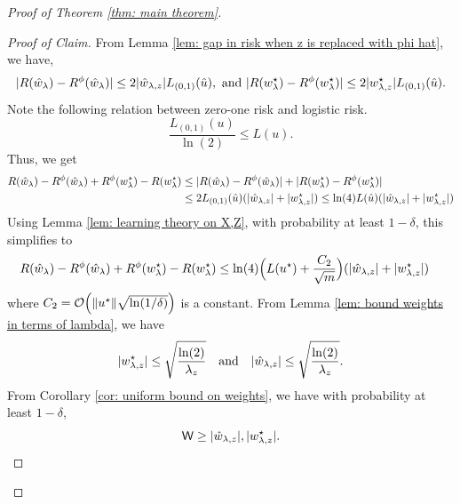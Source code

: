\begin{proof}[Proof of Theorem \ref{thm: main theorem}]
    \begin{proof}[Proof of Claim]
        From Lemma \ref{lem: gap in risk when z is replaced with phi hat}, we have,
        \begin{equation*}
            |R(\hat{w}_\lambda) - R^\phi(\hat{w}_\lambda)|
            \leq 2|\hat{w}_{\lambda,z}|L_{(0,1)}(\hat{u}),\textrm{ and }
            |R(w^\star_{\lambda}) - R^\phi(w^\star_{\lambda})|
            \leq 2|w^\star_{{\lambda,z}}|L_{(0,1)}(\hat{u}).
        \end{equation*}
        Note the following relation between zero-one risk and logistic risk. 
\begin{equation*}
    \frac{L_{(0,1)}(u)}{\ln(2)} \leq L(u).
\end{equation*}
        Thus, we get
        \begin{equation*}
            \begin{aligned}
                  R(\hat{w}_\lambda) - R^\phi(\hat{w}_\lambda) + R^\phi(w^\star_{\lambda}) - R(w^\star_{\lambda})\leq &\;|R(\hat{w}_\lambda) - R^\phi(\hat{w}_\lambda)| + |R(w^\star_{\lambda}) - R^\phi(w^\star_{\lambda})|\\
                  \leq &\;2L_{(0,1)}(\hat{u})(|\hat{w}_{\lambda,z}| + |w^\star_{{\lambda,z}}|) \leq \ln(4)L(\hat{u})(|\hat{w}_{\lambda,z}| + |w^\star_{{\lambda,z}}|)
            \end{aligned}
        \end{equation*}
Using Lemma \ref{lem: learning theory on X,Z}, with probability at least $1-\delta$, this simplifies to
        \begin{equation*}
            \begin{aligned}
                R(\hat{w}_\lambda) - R^\phi(\hat{w}_\lambda) + R^\phi(w^\star_{\lambda}) - R(w^\star_{\lambda})
                &\leq \ln(4)\Big(L(u^\star) + \frac{C_2}{\sqrt{m}}\Big)(|\hat{w}_{\lambda,z}| + |w^\star_{{\lambda,z}}|)
            \end{aligned}
        \end{equation*}
        where $C_2 = \mathcal{O}\Big(\|u^\star\|\sqrt{\ln(1/\delta)}\Big)$ is a constant.
        From Lemma \ref{lem: bound weights in terms of lambda}, we have
        \begin{equation*}
            |w^\star_{{\lambda,z}}| \leq \sqrt{\frac{\ln(2)}{\lambda_z}}
            \quad \text{and} \quad
            |\hat{w}_{\lambda,z}| \leq  \sqrt{\frac{\ln(2)}{\lambda_z}}.
        \end{equation*}
        From Corollary \ref{cor: uniform bound on weights}, we have with probability at least $1-\delta$,
        \begin{equation*}
            \mathsf{W} \geq |\hat{w}_{\lambda,z}|, |w^\star_{{\lambda,z}}|.
        \end{equation*}

\end{proof}
\end{proof}
